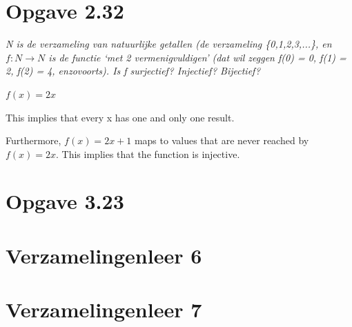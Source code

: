 \documentclass[11pt]{article}
\begin{document}
\section*{Opgave 2.32}
\textit{N is de verzameling van natuurlijke getallen (de verzameling \{0,1,2,3,...\}, en $ f : N \rightarrow N $ is de functie ‘met 2 vermenigvuldigen’ (dat wil zeggen f(0) = 0, f(1) = 2, f(2) = 4, enzovoorts). Is f surjectief? Injectief? Bijectief?}
\newline

$ f(x) = 2x $

This implies that every x has one and only one result.

Furthermore, $ f(x) = 2x + 1$ maps to values that are never reached by $ f(x) = 2x $. This implies that the function is injective.



\section*{Opgave 3.23}

\section*{Verzamelingenleer 6}

\section*{Verzamelingenleer 7}



\end{document}
